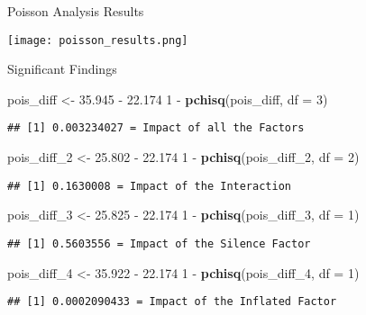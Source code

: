 \documentclass[ignorenonframetext,]{beamer}
\newenvironment{Shaded}{\linespread{1}}{}{\begin{snugshade}}{\end{snugshade}}
\newcommand{\KeywordTok}[1]{\textcolor[rgb]{0.13,0.29,0.53}{\textbf{{#1}}}}
\newcommand{\DataTypeTok}[1]{\textcolor[rgb]{0.13,0.29,0.53}{{#1}}}
\newcommand{\DecValTok}[1]{\textcolor[rgb]{0.00,0.00,0.81}{{#1}}}
\newcommand{\FloatTok}[1]{\textcolor[rgb]{0.00,0.00,0.81}{{#1}}}
\newcommand{\StringTok}[1]{\textcolor[rgb]{0.31,0.60,0.02}{{#1}}}
\newcommand{\NormalTok}[1]{{#1}}
\begin{document}
\begin{frame}{Poisson Analysis Results}

  \texttt{[image: poisson\_results.png]}

\end{frame}

\begin{frame}[fragile]{Significant Findings}

\begin{Shaded}
\begin{Highlighting}[]
\NormalTok{pois_diff <-}\StringTok{ }\FloatTok{35.945} \NormalTok{-}\StringTok{ }\FloatTok{22.174}
\DecValTok{1} \NormalTok{-}\StringTok{ }\KeywordTok{pchisq}\NormalTok{(pois_diff, }\DataTypeTok{df =} \DecValTok{3}\NormalTok{)}
\end{Highlighting}
\end{Shaded}

\begin{verbatim}
## [1] 0.003234027 = Impact of all the Factors
\end{verbatim}

\begin{Shaded}
\begin{Highlighting}[]
\NormalTok{pois_diff_2 <-}\StringTok{ }\FloatTok{25.802} \NormalTok{-}\StringTok{ }\FloatTok{22.174}
\DecValTok{1} \NormalTok{-}\StringTok{ }\KeywordTok{pchisq}\NormalTok{(pois_diff_2, }\DataTypeTok{df =} \DecValTok{2}\NormalTok{)}
\end{Highlighting}
\end{Shaded}

\begin{verbatim}
## [1] 0.1630008 = Impact of the Interaction
\end{verbatim}

\begin{Shaded}
\begin{Highlighting}[]
\NormalTok{pois_diff_3 <-}\StringTok{ }\FloatTok{25.825} \NormalTok{-}\StringTok{ }\FloatTok{22.174} 
\DecValTok{1} \NormalTok{-}\StringTok{ }\KeywordTok{pchisq}\NormalTok{(pois_diff_3, }\DataTypeTok{df =} \DecValTok{1}\NormalTok{)}
\end{Highlighting}
\end{Shaded}

\begin{verbatim}
## [1] 0.5603556 = Impact of the Silence Factor
\end{verbatim}

\begin{Shaded}
\begin{Highlighting}[]
\NormalTok{pois_diff_4 <-}\StringTok{ }\FloatTok{35.922} \NormalTok{-}\StringTok{ }\FloatTok{22.174} 
\DecValTok{1} \NormalTok{-}\StringTok{ }\KeywordTok{pchisq}\NormalTok{(pois_diff_4, }\DataTypeTok{df =} \DecValTok{1}\NormalTok{)}
\end{Highlighting}
\end{Shaded}

\begin{verbatim}
## [1] 0.0002090433 = Impact of the Inflated Factor
\end{verbatim}

\end{frame}
\end{document}
